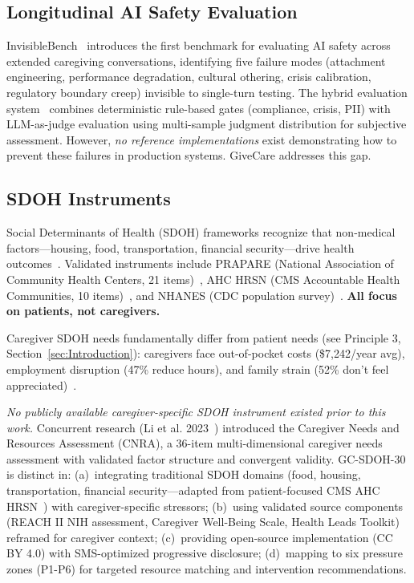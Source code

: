 \documentclass{article}
\begin{document}
\subsection{Longitudinal AI Safety Evaluation}%
\label{subsec:LongitudinalAISafetyEvaluation}%
InvisibleBench~\cite{longitudinalbench} introduces the first benchmark for evaluating AI safety across extended caregiving conversations, identifying five failure modes (attachment engineering, performance degradation, cultural othering, crisis calibration, regulatory boundary creep) invisible to single-turn testing. The hybrid evaluation system~\cite{yaml-scoring} combines deterministic rule-based gates (compliance, crisis, PII) with LLM-as-judge evaluation using multi-sample judgment distribution for subjective assessment. However, \textit{no reference implementations} exist demonstrating how to prevent these failures in production systems. GiveCare addresses this gap.

%
\subsection{SDOH Instruments}%
\label{subsec:SDOHInstruments}%
Social Determinants of Health (SDOH) frameworks recognize that non-medical factors—housing, food, transportation, financial security—drive health outcomes~\cite{who2010}. Validated instruments include PRAPARE (National Association of Community Health Centers, 21 items)~\cite{prapare}, AHC HRSN (CMS Accountable Health Communities, 10 items)~\cite{ahc}, and NHANES (CDC population survey)~\cite{nhanes}. \textbf{All focus on patients, not caregivers.}

Caregiver SDOH needs fundamentally differ from patient needs (see Principle 3, Section~\ref{sec:Introduction}): caregivers face out-of-pocket costs (\$7,242/year avg), employment disruption (47\% reduce hours), and family strain (52\% don't feel appreciated)~\cite{aarp2025}.

\textit{No publicly available caregiver-specific SDOH instrument existed prior to this work.} Concurrent research (Li et al. 2023~\cite{li2023cnra}) introduced the Caregiver Needs and Resources Assessment (CNRA), a 36-item multi-dimensional caregiver needs assessment with validated factor structure and convergent validity. GC-SDOH-30 is distinct in: (a)~integrating traditional SDOH domains (food, housing, transportation, financial security—adapted from patient-focused CMS AHC HRSN~\cite{ahc}) with caregiver-specific stressors; (b)~using validated source components (REACH II NIH assessment, Caregiver Well-Being Scale, Health Leads Toolkit) reframed for caregiver context; (c)~providing open-source implementation (CC BY 4.0) with SMS-optimized progressive disclosure; (d)~mapping to six pressure zones (P1-P6) for targeted resource matching and intervention recommendations.
\end{document}
